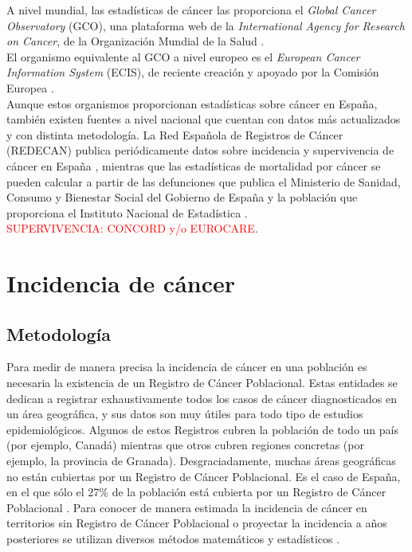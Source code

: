 A nivel mundial, las estadísticas de cáncer las proporciona el \textit{Global Cancer Observatory} (GCO), una plataforma web de la \textit{International Agency for Research on Cancer}, de la Organización Mundial de la Salud \cite{Bray2018, GCO}.\\

El organismo equivalente al GCO a nivel europeo es el \textit{European Cancer Information System} (ECIS), de reciente creación y apoyado por la Comisión Europea \cite{ECIS, ECIS2}.\\

Aunque estos organismos proporcionan estadísticas sobre cáncer en España, también existen fuentes a nivel nacional que cuentan con datos más actualizados y con distinta metodología. La Red Española de Registros de Cáncer (REDECAN) publica periódicamente datos sobre incidencia y supervivencia de cáncer en España \cite{REDECAN2020, Guevara2019}, mientras que las estadísticas de mortalidad por cáncer se pueden calcular a partir de las defunciones que publica el Ministerio de Sanidad, Consumo y Bienestar Social del Gobierno de España \cite{MSCBS} y la población que proporciona el Instituto Nacional de Estadística \cite{INEpob}.\\

\textcolor{red}{SUPERVIVENCIA: CONCORD y/o EUROCARE}.


\section{Incidencia de cáncer}

\subsection{Metodología}

Para medir de manera precisa la incidencia de cáncer en una población es necesaria la existencia de un Registro de Cáncer Poblacional. Estas entidades se dedican a registrar exhaustivamente todos los casos de cáncer diagnosticados en un área geográfica, y sus datos son muy útiles para todo tipo de estudios epidemiológicos. Algunos de estos Registros cubren la población de todo un país (por ejemplo, Canadá) mientras que otros cubren regiones concretas (por ejemplo, la provincia de Granada). Desgraciadamente, muchas áreas geográficas no están cubiertas por un Registro de Cáncer Poblacional. Es el caso de España, en el que sólo el 27\% de la población está cubierta por un Registro de Cáncer Poblacional \cite{Redondo-Sanchez2019}. Para conocer de manera estimada la incidencia de cáncer en territorios sin Registro de Cáncer Poblacional o proyectar la incidencia a años posteriores se utilizan diversos métodos matemáticos y estadísticos \cite{Bray2018, GCO, ECIS, ECIS2, REDECAN2020, Redondo-Sanchez2019}.\\

